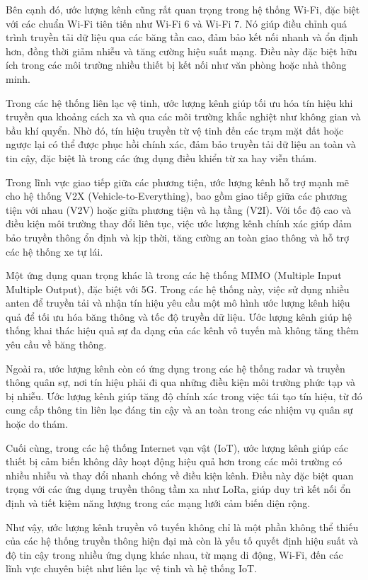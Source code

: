 Bên cạnh đó, ước lượng kênh cũng rất quan trọng trong hệ thống Wi-Fi, đặc biệt với các chuẩn Wi-Fi tiên tiến như Wi-Fi 6 và Wi-Fi 7. Nó giúp điều chỉnh quá trình truyền tải dữ liệu qua các băng tần cao, đảm bảo kết nối nhanh và ổn định hơn, đồng thời giảm nhiễu và tăng cường hiệu suất mạng. Điều này đặc biệt hữu ích trong các môi trường nhiều thiết bị kết nối như văn phòng hoặc nhà thông minh.

Trong các hệ thống liên lạc vệ tinh, ước lượng kênh giúp tối ưu hóa tín hiệu khi truyền qua khoảng cách xa và qua các môi trường khắc nghiệt như không gian và bầu khí quyển. Nhờ đó, tín hiệu truyền từ vệ tinh đến các trạm mặt đất hoặc ngược lại có thể được phục hồi chính xác, đảm bảo truyền tải dữ liệu an toàn và tin cậy, đặc biệt là trong các ứng dụng điều khiển từ xa hay viễn thám.

Trong lĩnh vực giao tiếp giữa các phương tiện, ước lượng kênh hỗ trợ mạnh mẽ cho hệ thống V2X (Vehicle-to-Everything), bao gồm giao tiếp giữa các phương tiện với nhau (V2V) hoặc giữa phương tiện và hạ tầng (V2I). Với tốc độ cao và điều kiện môi trường thay đổi liên tục, việc ước lượng kênh chính xác giúp đảm bảo truyền thông ổn định và kịp thời, tăng cường an toàn giao thông và hỗ trợ các hệ thống xe tự lái.

Một ứng dụng quan trọng khác là trong các hệ thống MIMO (Multiple Input Multiple Output), đặc biệt với 5G. Trong các hệ thống này, việc sử dụng nhiều anten để truyền tải và nhận tín hiệu yêu cầu một mô hình ước lượng kênh hiệu quả để tối ưu hóa băng thông và tốc độ truyền dữ liệu. Ước lượng kênh giúp hệ thống khai thác hiệu quả sự đa dạng của các kênh vô tuyến mà không tăng thêm yêu cầu về băng thông.

Ngoài ra, ước lượng kênh còn có ứng dụng trong các hệ thống radar và truyền thông quân sự, nơi tín hiệu phải đi qua những điều kiện môi trường phức tạp và bị nhiễu. Ước lượng kênh giúp tăng độ chính xác trong việc tái tạo tín hiệu, từ đó cung cấp thông tin liên lạc đáng tin cậy và an toàn trong các nhiệm vụ quân sự hoặc do thám.

Cuối cùng, trong các hệ thống Internet vạn vật (IoT), ước lượng kênh giúp các thiết bị cảm biến không dây hoạt động hiệu quả hơn trong các môi trường có nhiều nhiễu và thay đổi nhanh chóng về điều kiện kênh. Điều này đặc biệt quan trọng với các ứng dụng truyền thông tầm xa như LoRa, giúp duy trì kết nối ổn định và tiết kiệm năng lượng trong các mạng lưới cảm biến diện rộng.

Như vậy, ước lượng kênh truyền vô tuyến không chỉ là một phần không thể thiếu của các hệ thống truyền thông hiện đại mà còn là yếu tố quyết định hiệu suất và độ tin cậy trong nhiều ứng dụng khác nhau, từ mạng di động, Wi-Fi, đến các lĩnh vực chuyên biệt như liên lạc vệ tinh và hệ thống IoT.